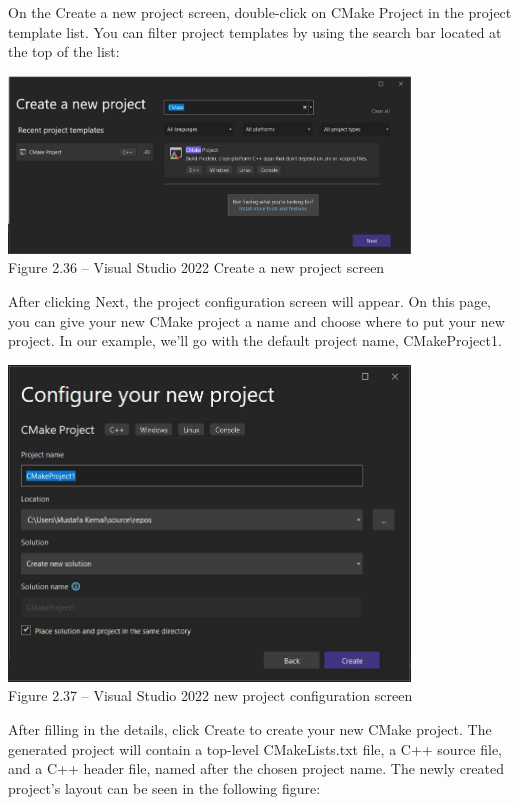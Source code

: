On the Create a new project screen, double-click on CMake Project in the project template list. You can filter project templates by using the search bar located at the top of the list:

\begin{center}
\includegraphics[width=0.8\textwidth]{content/1/chapter2/images/36.jpg}\\
Figure 2.36 – Visual Studio 2022 Create a new project screen
\end{center}

After clicking Next, the project configuration screen will appear. On this page, you can give your new CMake project a name and choose where to put your new project. In our example, we'll go with the default project name, CMakeProject1.

\begin{center}
\includegraphics[width=0.8\textwidth]{content/1/chapter2/images/37.jpg}\\
Figure 2.37 – Visual Studio 2022 new project configuration screen
\end{center}

After filling in the details, click Create to create your new CMake project. The generated project will contain a top-level CMakeLists.txt file, a C++ source file, and a C++ header file, named after the chosen project name. The newly created project's layout can be seen in the following figure:

